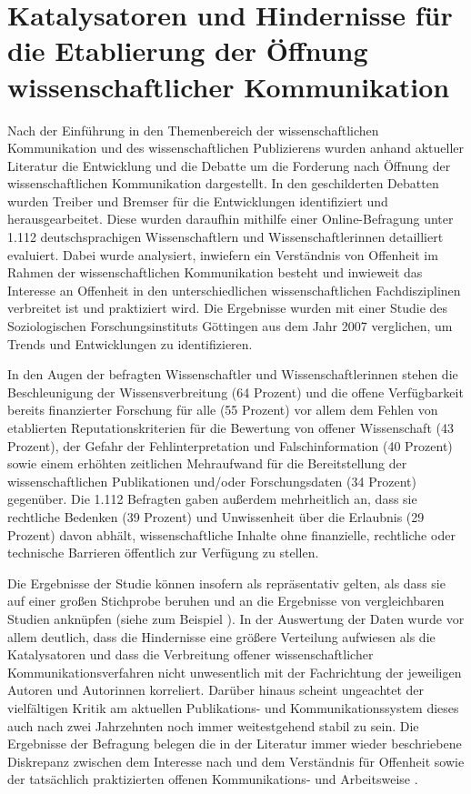 \section{Katalysatoren und Hindernisse für die Etablierung der Öffnung wissenschaftlicher Kommunikation}

Nach der Einführung in den Themenbereich der wissenschaftlichen Kommunikation und des wissenschaftlichen Publizierens wurden anhand aktueller Literatur die Entwicklung und die Debatte um die Forderung nach Öffnung der wissenschaftlichen Kommunikation dargestellt. In den geschilderten Debatten wurden Treiber und Bremser für die Entwicklungen identifiziert und herausgearbeitet. Diese wurden daraufhin mithilfe einer Online-Befragung unter 1.112 deutschsprachigen Wissenschaftlern und Wissenschaftlerinnen detailliert evaluiert. Dabei wurde analysiert, inwiefern ein Verständnis von Offenheit im Rahmen der wissenschaftlichen Kommunikation besteht und inwieweit das Interesse an Offenheit in den unterschiedlichen wissenschaftlichen Fachdisziplinen verbreitet ist und praktiziert wird. Die Ergebnisse wurden mit einer Studie des Soziologischen Forschungsinstituts Göttingen aus dem Jahr 2007 verglichen, um Trends und Entwicklungen zu identifizieren.

In den Augen der befragten Wissenschaftler und Wissenschaftlerinnen stehen die Beschleunigung der Wissensverbreitung (64 Prozent) und die offene Verfügbarkeit bereits finanzierter Forschung für alle (55 Prozent) vor allem dem Fehlen von etablierten Reputationskriterien für die Bewertung von offener Wissenschaft (43 Prozent), der Gefahr der Fehlinterpretation und Falschinformation (40 Prozent) sowie einem erhöhten zeitlichen Mehraufwand für die Bereitstellung der wissenschaftlichen Publikationen und/oder Forschungsdaten (34 Prozent) gegenüber. Die 1.112 Befragten gaben außerdem mehrheitlich an, dass sie rechtliche Bedenken (39 Prozent) und Unwissenheit über die Erlaubnis (29 Prozent) davon abhält, wissenschaftliche Inhalte ohne finanzielle, rechtliche oder technische Barrieren öffentlich zur Verfügung zu stellen.

Die Ergebnisse der Studie können insofern als repräsentativ gelten, als dass sie auf einer großen Stichprobe beruhen und an die Ergebnisse von vergleichbaren Studien anknüpfen (siehe zum Beispiel \cite{Hanekop_2007}). In der Auswertung der Daten wurde vor allem deutlich, dass die Hindernisse eine größere Verteilung aufwiesen als die Katalysatoren und dass die Verbreitung offener wissenschaftlicher Kommunikationsverfahren nicht unwesentlich mit der Fachrichtung der jeweiligen Autoren und Autorinnen korreliert. Darüber hinaus scheint ungeachtet der vielfältigen Kritik am aktuellen Publikations- und Kommunikationssystem dieses auch nach zwei Jahrzehnten noch immer weitestgehend stabil zu sein. Die Ergebnisse der Befragung belegen die in der Literatur immer wieder beschriebene Diskrepanz zwischen dem Interesse nach und dem Verständnis für Offenheit sowie der tatsächlich praktizierten offenen Kommunikations- und Arbeitsweise \cite{Yiotis_2013} \cite{Bartling_2013} \cite{Hagner_2015} \cite{Fecher_2015}.

